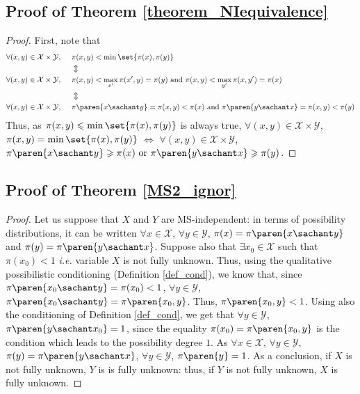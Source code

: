 \subsection{Proof of Theorem \ref{theorem_NIequivalence}}
\label{theorem_NIequivalence_RETURN}
\begin{proof}
First, note that
\begin{align*}
\forall (x,y) \in \mathcal{X} \times \mathcal{Y}, \hspace{0.5cm} & \pi(x,y) < \min \set{ \pi(x), \pi(y) } \\
 &\Updownarrow \\
\forall (x,y) \in \mathcal{X} \times \mathcal{Y}, \hspace{0.5cm} & \pi(x,y) < \max_{x'} \pi(x',y) = \pi(y) \mbox{ and } \pi(x,y) < \max_{y'} \pi(x,y') = \pi(x)\\
& \Updownarrow \\
\forall (x,y) \in \mathcal{X} \times \mathcal{Y}, \hspace{0.5cm} & \pi\paren{x \sachant y} = \pi(x,y) < \pi(x) \mbox{ and } \pi\paren{y \sachant x} = \pi(x,y) < \pi(y)
\end{align*}
Thus, as $\pi(x,y) \leqslant \min \set{ \pi(x), \pi(y) }$ is always true,
$\forall (x,y) \in \mathcal{X} \times \mathcal{Y}$, $\pi(x,y) = \min \set{ \pi(x), \pi(y) }$
$\Leftrightarrow$ $\forall (x,y) \in \mathcal{X} \times \mathcal{Y}$, $\pi\paren{x \sachant y} \geqslant \pi(x) \mbox{ or } \pi\paren{y \sachant x} \geqslant \pi(y)$.
\end{proof}







\subsection{Proof of Theorem \ref{MS2_ignor}}
\label{MS2_ignor_RETURN}
\begin{proof}
Let us suppose that $X$ and $Y$ are MS-independent: in terms of possibility distributions,
it can be written $\forall x \in \mathcal{X}$, $\forall y \in \mathcal{Y}$, 
$\pi(x)=\pi \paren{ x \sachant y}$ and $\pi(y) = \pi \paren{ y \sachant x }$.
Suppose also that $\exists x_0 \in \mathcal{X}$ such that $\pi(x_0)<1$ 
\textit{i.e.} variable $X$ is not fully unknown.
Thus, using the qualitative possibilistic conditioning (Definition \ref{def_cond}),
we know that, since $\pi \paren{ x_0 \sachant y} = \pi(x_0) <1$, 
$\forall y \in \mathcal{Y}$, $\pi \paren{ x_0 \sachant y} = \pi \paren{x_0, y}$.
Thus, $\pi \paren{x_0, y} < 1$.
Using also the conditioning of Definition \ref{def_cond}, 
we get that $\forall y \in \mathcal{Y}$, $\pi \paren{ y \sachant x_0 }=1$,
since the equality $\pi(x_0) = \pi \paren{x_0, y}$ is the condition which leads to the possibility degree $1$.
As $\forall x \in \mathcal{X}$, $\forall y \in \mathcal{Y}$, $\pi(y) = \pi \paren{ y \sachant x }$,  $\forall y \in \mathcal{Y}$, $\pi \paren{ y  }=1$.
As a conclusion, if $X$ is not fully unknown, $Y$ is is fully unknown: 
thus, if $Y$ is not fully unknown, $X$ is fully unknown.
\end{proof}




